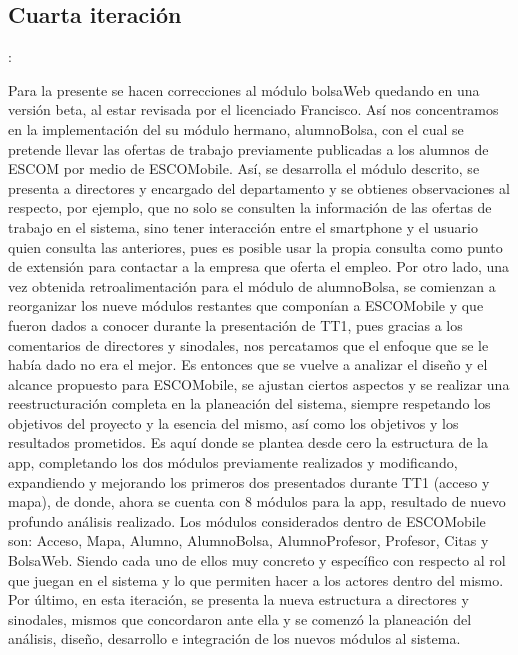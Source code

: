 
\subsection{Cuarta iteración}: 

\noindent
Para la presente se hacen correcciones al módulo bolsaWeb quedando en una versión beta, al estar revisada por el licenciado Francisco. Así nos concentramos en la implementación del su módulo hermano, alumnoBolsa, con el cual se pretende llevar las ofertas de trabajo previamente publicadas a los alumnos de ESCOM por medio de ESCOMobile. Así, se desarrolla el módulo descrito, se presenta a directores y encargado del departamento y se obtienes observaciones al respecto, por ejemplo, que no solo se consulten la información de las ofertas de trabajo en el sistema, sino tener interacción entre el smartphone y el usuario quien consulta las anteriores, pues es posible usar la propia consulta como punto de extensión para contactar a la empresa que oferta el empleo. 
\newline
\newline
Por otro lado, una vez obtenida retroalimentación para el módulo de alumnoBolsa, se comienzan a reorganizar los nueve módulos restantes que componían a ESCOMobile y que fueron dados a conocer durante la presentación de TT1, pues gracias a los comentarios de directores y sinodales, nos percatamos que el enfoque que se le había dado no era el mejor. Es entonces que se vuelve a analizar el diseño y el alcance propuesto para ESCOMobile, se ajustan ciertos aspectos y se realizar una reestructuración completa en la planeación del sistema, siempre respetando los objetivos del proyecto y la esencia del mismo, así como los objetivos y los resultados prometidos.
\newline
Es aquí donde se plantea desde cero la estructura de la app, completando los dos módulos previamente realizados y modificando, expandiendo y mejorando los primeros dos presentados durante TT1 (acceso y mapa), de donde, ahora se cuenta con 8 módulos para la app, resultado de nuevo profundo análisis realizado. Los módulos considerados dentro de ESCOMobile son: Acceso, Mapa, Alumno, AlumnoBolsa, AlumnoProfesor, Profesor, Citas y BolsaWeb. Siendo cada uno de ellos muy concreto y específico con respecto al rol que juegan en el sistema y lo que permiten hacer a los actores dentro del mismo. 
\newline
Por último, en esta iteración, se presenta la nueva estructura a directores y sinodales, mismos que concordaron ante ella y se comenzó la planeación del análisis, diseño, desarrollo e integración de los nuevos módulos al sistema.
